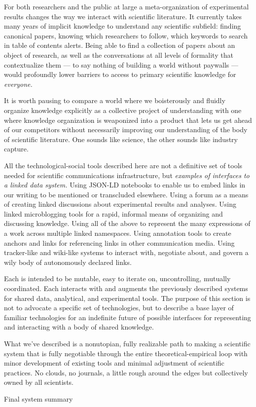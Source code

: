 \documentclass[10pt]{article}
\begin{document}
\begin{multicols}{2}
For both researchers and the public at large a meta-organization of
experimental results changes the way we interact with scientific
literature. It currently takes many years of implicit knowledge to
understand any scientific subfield: finding canonical papers, knowing
which researchers to follow, which keywords to search in table of
contents alerts. Being able to find a collection of papers about an
object of research, as well as the conversations at all levels of
formality that contextualize them --- to say nothing of building a world
without paywalls --- would profoundly lower barriers to access to
primary scientific knowledge for \emph{everyone.}

It is worth pausing to compare a world where we boisterously and fluidly
organize knowledge explicitly as a collective project of understanding
with one where knowledge organization is weaponized into a product that
lets us get ahead of our competitors without necessarily improving our
understanding of the body of scientific literature. One sounds like
science, the other sounds like industry capture.

All the technological-social tools described here are not a definitive
set of tools needed for scientific communications infrastructure, but
\emph{examples of interfaces to a linked data system.} Using JSON-LD
notebooks to enable us to embed links in our writing to be mentioned or
transcluded elsewhere. Using a forum as a means of creating linked
discussions about experimental results and analyses. Using linked
microblogging tools for a rapid, informal means of organizing and
discussing knowledge. Using all of the above to represent the many
expressions of a work across multiple linked namespaces. Using
annotation tools to create anchors and links for referencing links in
other communication media. Using tracker-like and wiki-like systems to
interact with, negotiate about, and govern a wily body of autonomously
declared links.

Each is intended to be mutable, easy to iterate on, uncontrolling,
mutually coordinated. Each interacts with and augments the previously
described systems for shared data, analytical, and experimental tools.
The purpose of this section is not to advocate a specific set of
technologies, but to describe a base layer of familiar technologies for
an indefinite future of possible interfaces for representing and
interacting with a body of shared knowledge.

What we've described is a nonutopian, fully realizable path to making a
scientific system that is fully negotiable through the entire
theoretical-empirical loop with minor development of existing tools and
minimal adjustment of scientific practices. No clouds, no journals, a
little rough around the edges but collectively owned by all scientists.

Final system summary


\end{multicols}
\end{document}
